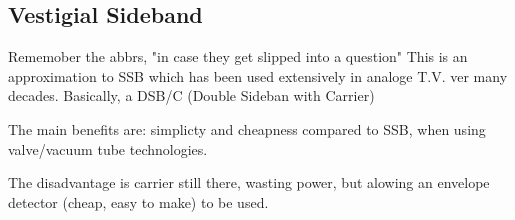 \documentclass[11pt]{article} %
\begin{document}
\subsection{Vestigial Sideband}
Rememober the abbrs, "in case they get slipped into a question"
This is an approximation to SSB which has been used extensively in analoge T.V. ver many decades. Basically, a DSB/C (Double Sideban with Carrier)


The main benefits are: simplicty and cheapness compared to SSB, when using valve/vacuum tube technologies.

The disadvantage is carrier still there, wasting power, but alowing an envelope detector (cheap, easy to make) to be used.
\end{document}
